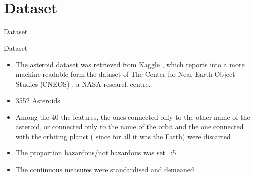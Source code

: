 \documentclass{beamer}
\begin{document}
\section{Dataset}

\begin{frame}{}
\begin{center}
{\Huge Dataset}
\end{center}
\end{frame}

\begin{frame}{Dataset}
\begin{itemize}


\item The asteroid dataset was retrieved from Kaggle \cite{kaggle_dataset}, which reports into a more machine readable form the dataset of The Center for Near-Earth Object Studies (CNEOS) \cite{cneos+nasa}, a NASA research centre.

\item 3552 Asteroids

\item Among the 40 the features, the ones connected only to the other name of
the asteroid, or connected only to the name of the orbit and
the one connected with the orbiting planet ( since for all it was
the Earth) were discarted

\item The proportion hazardous/not hazardous was set 1:5  

\item The continuous measures were standardised and demeaned

\end{itemize}
\end{frame}
\end{document}
